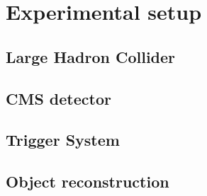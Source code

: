 \section{Experimental setup}\label{sec:Introduction_Experiment}

\subsection{Large Hadron Collider}\label{sec:Introduction_Experiment_LHC}


\subsection{CMS detector}\label{sec:Introduction_Experiment_CMS}




\subsection{Trigger System}


\subsection{Object reconstruction}



